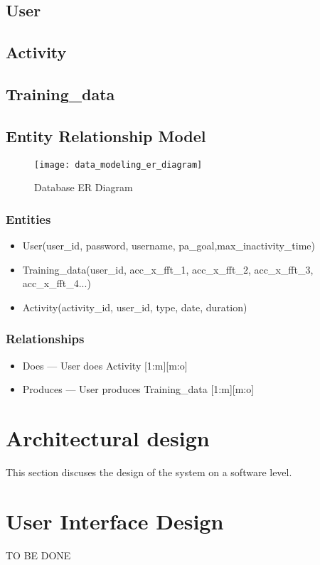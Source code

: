         \subsection{User}
        
        \subsection{Activity}
        
        \subsection{Training\_data}
        
        \subsection{Entity Relationship Model}
        
        \begin{figure}[ht]
            \centering
            \texttt{[image: data\_modeling\_er\_diagram]}
            \caption{Database ER Diagram}
            \label{fig:data_modeling_er_diagram}
        \end{figure}
        
        \subsubsection{Entities}
        
        \begin{itemize}
            \item User(user\_id, password, username, pa\_goal,max\_inactivity\_time)
            \item Training\_data(user\_id, acc\_x\_fft\_1, acc\_x\_fft\_2, acc\_x\_fft\_3, acc\_x\_fft\_4...)
            \item Activity(activity\_id, user\_id, type, date, duration)
        \end{itemize}
        
        \subsubsection{Relationships}
        \begin{itemize}
        \item Does --- User does Activity [1:m][m:o]
        \item Produces --- User produces Training\_data [1:m][m:o]
        \end{itemize}
    
    
    \section{Architectural design}
    This section discuses the design of the system on a software level.
    
        
    \section{User Interface Design}
    TO BE DONE